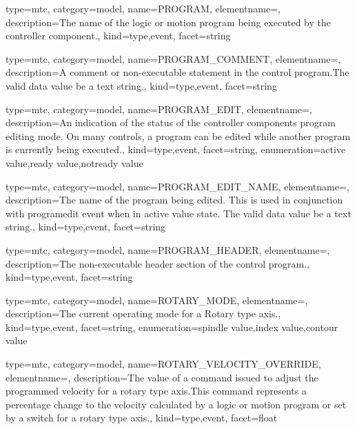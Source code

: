 {
  type=mtc,
  category=model,
  name={PROGRAM},
  elementname=,
  description={The name of the logic or motion program being executed by the \gls{controller} component.},
  kind={type,event},
  facet={\gls{string}}
}


{
  type=mtc,
  category=model,
  name={PROGRAM\_COMMENT},
  elementname=,
  description={A comment or non-executable statement in the control program.The \gls{valid data value} \must be a text string.},
  kind={type,event},
  facet={\gls{string}}
}


{
  type=mtc,
  category=model,
  name={PROGRAM\_EDIT},
  elementname=,
  description={An indication of the status of the \gls{controller} components program editing mode. \newline On many controls, a program can be edited while another program is currently being executed.},
  kind={type,event},
  facet={\gls{string}},
  enumeration={\gls{active value},\gls{ready value},\gls{notready value}}
}


{
  type=mtc,
  category=model,
  name={PROGRAM\_EDIT\_NAME},
  elementname=,
  description={The name of the program being edited. \newline This is used in conjunction with \gls{programedit event} when in \gls{active value} state. \newline The \gls{valid data value} \must be a text string.},
  kind={type,event},
  facet={\gls{string}}
}


{
  type=mtc,
  category=model,
  name={PROGRAM\_HEADER},
  elementname=,
  description={The non-executable header section of the control program.},
  kind={type,event},
  facet={\gls{string}}
}


{
  type=mtc,
  category=model,
  name={ROTARY\_MODE},
  elementname=,
  description={The current operating mode for a Rotary type axis.},
  kind={type,event},
  facet={\gls{string}},
  enumeration={\gls{spindle value},\gls{index value},\gls{contour value}}
}


{
  type=mtc,
  category=model,
  name={ROTARY\_VELOCITY\_OVERRIDE},
  elementname=,
  description={The value of a command issued to adjust the programmed velocity for a \gls{rotary} type axis.This command represents a percentage change to the velocity calculated by a logic or motion program or set by a switch for a \gls{rotary} type axis.},
  kind={type,event},
  facet={\gls{float}}
}


